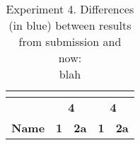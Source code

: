 \begin{table}

\experimentTableSize

\begin{tabular}{l|cccc}
& \multicolumn{2}{c}{\textbf{\leon{}}}
& \multicolumn{2}{c}{\textbf{\synquid{}}} \\\hline
& \multicolumn{2}{c}{\textbf{4}}
& \multicolumn{2}{c}{\textbf{4}} \\\hline
\textbf{Name} &
\textbf{1} & \textbf{2a} &
\textbf{1} & \textbf{2a} \\

\end{tabular}

\vspace{0.10in}

\caption{Experiment 4.
%
Differences (in blue) between results from submission and now:
%
\experimentCaptionSize
%
\\[3pt]
%
blah
%
}

\end{table}
